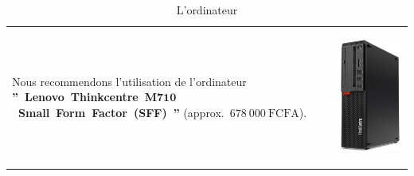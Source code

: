 \documentclass[12pt, a4paper]{article}
\newcommand{\money}[1]{$#1\ \text{FCFA}$}
\begin{document}
\begin{table}[!htbp]
\begin{tabular}{lr}
\parbox{25em}{
Nous recommendons l'utilisation de
l'ordinateur
\textbf{''~Lenovo~Thinkcentre~M$\mathbf{710}$~Small~Form~Factor~(SFF)~''}
(approx.~\money{678~000}).
\vspace{-3em}
}

&

\parbox{17em}{
\begin{center}
\includegraphics[scale=0.14]{images/lenovo-thinkcentre-m710sff-hardware.png}
\caption*{L'ordinateur}
\end{center}
}
\end{tabular}
\end{table}
	
\end{document}
